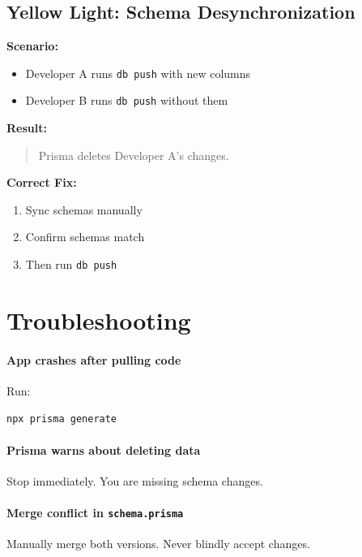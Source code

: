 \documentclass[11pt]{article}
\begin{document}
\subsection*{Yellow Light: Schema Desynchronization}

\textbf{Scenario:}
\begin{itemize}
    \item Developer A runs \texttt{db push} with new columns
    \item Developer B runs \texttt{db push} without them
\end{itemize}

\textbf{Result:}
\begin{quote}
Prisma deletes Developer A's changes.
\end{quote}

\textbf{Correct Fix:}
\begin{enumerate}
    \item Sync schemas manually
    \item Confirm schemas match
    \item Then run \texttt{db push}
\end{enumerate}

\section{Troubleshooting}

\paragraph{App crashes after pulling code}
Run:
\begin{lstlisting}[language=bash]
npx prisma generate
\end{lstlisting}

\paragraph{Prisma warns about deleting data}
Stop immediately. You are missing schema changes.

\paragraph{Merge conflict in \texttt{schema.prisma}}
Manually merge both versions. Never blindly accept changes.
\end{document}
